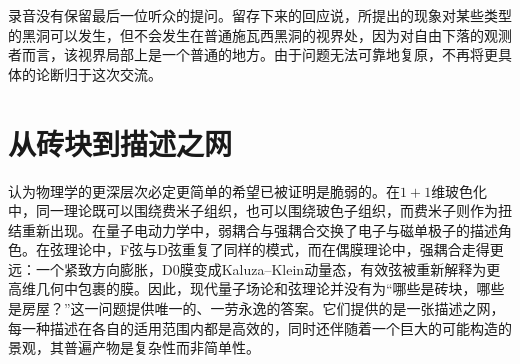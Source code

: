\begin{classroomqa}
\end{classroomqa}


录音没有保留最后一位听众的提问。留存下来的回应说，所提出的现象对某些类型的黑洞可以发生，但不会发生在普通施瓦西黑洞的视界处，因为对自由下落的观测者而言，该视界局部上是一个普通的地方。由于问题无法可靠地复原，不再将更具体的论断归于这次交流。

\section{从砖块到描述之网}

认为物理学的更深层次必定更简单的希望已被证明是脆弱的。在\(1+1\)维玻色化中，同一理论既可以围绕费米子组织，也可以围绕玻色子组织，而费米子则作为扭结重新出现。在量子电动力学中，弱耦合与强耦合交换了电子与磁单极子的描述角色。在弦理论中，F弦与D弦重复了同样的模式，而在偶膜理论中，强耦合走得更远：一个紧致方向膨胀，D0膜变成Kaluza--Klein动量态，有效弦被重新解释为更高维几何中包裹的膜。因此，现代量子场论和弦理论并没有为``哪些是砖块，哪些是房屋？''这一问题提供唯一的、一劳永逸的答案。它们提供的是一张描述之网，每一种描述在各自的适用范围内都是高效的，同时还伴随着一个巨大的可能构造的景观，其普遍产物是复杂性而非简单性。
